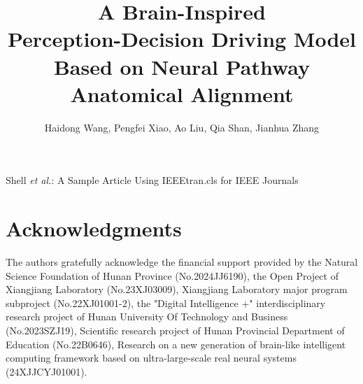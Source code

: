 \documentclass[lettersize,journal]{IEEEtran}
\begin{document}
\title{A Brain-Inspired \\ Perception-Decision Driving Model \\Based on Neural Pathway Anatomical Alignment}

\author{Haidong Wang, Pengfei Xiao, Ao Liu, Qia Shan, Jianhua Zhang
}

%
{Shell \MakeLowercase{\textit{et al.}}: A Sample Article Using IEEEtran.cls for IEEE Journals}


\maketitle

    






\section*{Acknowledgments}
The authors gratefully acknowledge the financial support provided by the Natural Science Foundation of Hunan Province (No.2024JJ6190), the Open Project of Xiangjiang Laboratory (No.23XJ03009), Xiangjiang Laboratory major program subproject (No.22XJ01001-2), the "Digital Intelligence +" interdisciplinary research project of Hunan University Of Technology and Business (No.2023SZJ19), Scientific research project of Hunan Provincial Department of Education (No.22B0646), Research on a new generation of brain-like intelligent computing framework based on ultra-large-scale real neural systems (24XJJCYJ01001).






\vfill
\end{document}
